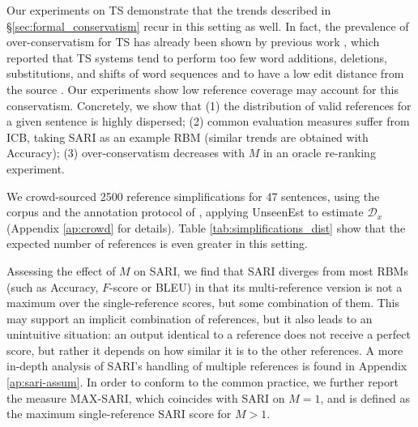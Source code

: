 \documentclass[a4paper, 11pt]{article}
\begin{document}
Our experiments on TS demonstrate that the trends described in \S\ref{sec:formal_conservatism} recur in this setting as well. 
In fact, the prevalence of over-conservatism for TS has already been shown by previous work \cite{alvamanchego-EtAl:2017:I17-1}, 
which reported that TS systems tend to perform too few word additions, deletions,
substitutions, and shifts of word sequences \cite{zhang-lapata:2017:EMNLP2017} 
and to have a low edit distance from the source \cite{narayan-gardent:2016:INLG}.
Our experiments show low reference coverage may account for this conservatism. Concretely, we show that
(1) the distribution of valid references for a given sentence is highly dispersed; 
(2) common evaluation measures suffer from ICB, taking SARI \cite{Xu-EtAl:2016:TACL} 
as an example RBM (similar trends are obtained with Accuracy); 
(3) over-conservatism decreases with $M$ in an oracle re-ranking experiment.

We crowd-sourced 2500 reference simplifications for 47 sentences, using the corpus and the annotation protocol of 
, applying {\sc UnseenEst} to estimate $\mathcal{D}_x$ (Appendix  \ref{ap:crowd} for details).
Table \ref{tab:simplifications_dist} show that the expected number of references is even greater in this setting. 

Assessing the effect of $M$ on SARI, we find that SARI diverges from most RBMs (such as Accuracy, $F$-score or BLEU) 
in that its multi-reference version is not a maximum over the single-reference scores, but some combination of them.
This may support an implicit combination of references, but it also leads to an unintuitive situation: an output identical to a reference does not receive a perfect score, but rather it depends on how similar it is to the other
references. A more in-depth analysis of SARI's handling of multiple references is found in Appendix \ref{ap:sari-assum}.
In order to conform to the common practice, we further report the measure MAX-SARI, which coincides with SARI on $M=1$, 
and is defined as the maximum single-reference SARI score for $M>1$.
\end{document}
